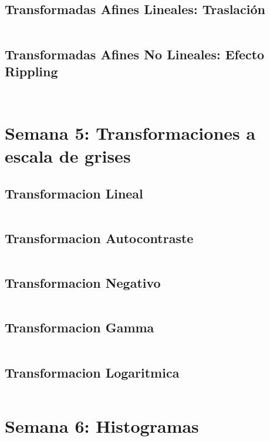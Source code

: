 \documentclass[10pt]{article}
\begin{document}
\subsection{Transformadas Afines Lineales: Traslación}
\inputminted{python}{2-transformadas_afines/2_2_2_trasladar.py}

\subsection{Transformadas Afines No Lineales: Efecto Rippling}
\inputminted{python}{2-transformadas_afines/2_3_rippling.py}
\inputminted{python}{2-transformadas_afines/2_3_rippling_animado.py}






\section{Semana 5: Transformaciones a escala de grises}

\subsection{Transformacion Lineal}
\inputminted{python}{3-transformaciones/transformacion-lineal.py}

\subsection{Transformacion Autocontraste}
\inputminted{matlab}{3-transformaciones/transformada-autocontraste.m}

\subsection{Transformacion Negativo}
\inputminted{python}{3-transformaciones/transformada-negativo.py}

\subsection{Transformacion Gamma}
\inputminted{python}{3-transformaciones/transformada-gamma.py}

\subsection{Transformacion Logaritmica}
\inputminted{matlab}{3-transformaciones/transformada-logaritmica.m}


\section{Semana 6: Histogramas}
\end{document}
